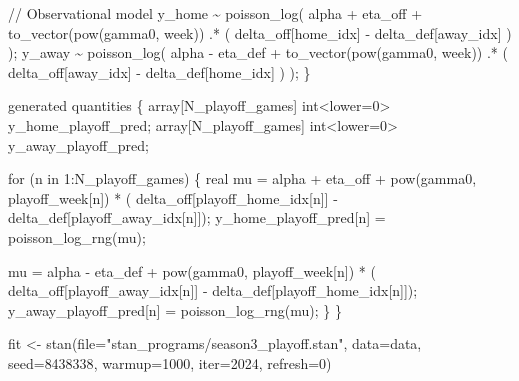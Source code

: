\documentclass[
  letterpaper,
  DIV=11,
  numbers=noendperiod]{scrartcl}
\newenvironment{Shaded}{\begin{snugshade}}{\end{snugshade}}
\newcommand{\AttributeTok}[1]{\textcolor[rgb]{0.40,0.45,0.13}{#1}}
\newcommand{\CommentTok}[1]{\textcolor[rgb]{0.37,0.37,0.37}{#1}}
\newcommand{\ControlFlowTok}[1]{\textcolor[rgb]{0.00,0.23,0.31}{#1}}
\newcommand{\DataTypeTok}[1]{\textcolor[rgb]{0.68,0.00,0.00}{#1}}
\newcommand{\DecValTok}[1]{\textcolor[rgb]{0.68,0.00,0.00}{#1}}
\newcommand{\FunctionTok}[1]{\textcolor[rgb]{0.28,0.35,0.67}{#1}}
\newcommand{\KeywordTok}[1]{\textcolor[rgb]{0.00,0.23,0.31}{#1}}
\newcommand{\NormalTok}[1]{\textcolor[rgb]{0.00,0.23,0.31}{#1}}
\newcommand{\OtherTok}[1]{\textcolor[rgb]{0.00,0.23,0.31}{#1}}
\newcommand{\StringTok}[1]{\textcolor[rgb]{0.13,0.47,0.30}{#1}}
\begin{document}
\begin{codelisting}
\begin{Shaded}
\begin{Highlighting}[]
  \CommentTok{// Observational model}
\NormalTok{  y\_home \textasciitilde{} poisson\_log(  alpha + eta\_off}
\NormalTok{                       + to\_vector(pow(gamma0, week))}
\NormalTok{                         .* (  delta\_off[home\_idx]}
\NormalTok{                             {-} delta\_def[away\_idx] ) );}
\NormalTok{  y\_away \textasciitilde{} poisson\_log(  alpha {-} eta\_def}
\NormalTok{                       + to\_vector(pow(gamma0, week))}
\NormalTok{                         .* (  delta\_off[away\_idx]}
\NormalTok{                             {-} delta\_def[home\_idx] ) );}
\NormalTok{\}}

\KeywordTok{generated quantities}\NormalTok{ \{}
  \DataTypeTok{array}\NormalTok{[N\_playoff\_games] }\DataTypeTok{int}\NormalTok{\textless{}}\KeywordTok{lower}\NormalTok{=}\DecValTok{0}\NormalTok{\textgreater{} y\_home\_playoff\_pred;}
  \DataTypeTok{array}\NormalTok{[N\_playoff\_games] }\DataTypeTok{int}\NormalTok{\textless{}}\KeywordTok{lower}\NormalTok{=}\DecValTok{0}\NormalTok{\textgreater{} y\_away\_playoff\_pred;}

  \ControlFlowTok{for}\NormalTok{ (n }\ControlFlowTok{in} \DecValTok{1}\NormalTok{:N\_playoff\_games) \{}
    \DataTypeTok{real}\NormalTok{ mu =  alpha + eta\_off}
\NormalTok{             + pow(gamma0, playoff\_week[n])}
\NormalTok{               * (  delta\_off[playoff\_home\_idx[n]]}
\NormalTok{                  {-} delta\_def[playoff\_away\_idx[n]]);}
\NormalTok{    y\_home\_playoff\_pred[n] = poisson\_log\_rng(mu);}

\NormalTok{    mu =  alpha {-} eta\_def}
\NormalTok{        + pow(gamma0, playoff\_week[n])}
\NormalTok{          * (  delta\_off[playoff\_away\_idx[n]]}
\NormalTok{             {-} delta\_def[playoff\_home\_idx[n]]);}
\NormalTok{    y\_away\_playoff\_pred[n] = poisson\_log\_rng(mu);}
\NormalTok{  \}}
\NormalTok{\}}
\end{Highlighting}
\end{Shaded}

\end{codelisting}

\begin{Shaded}
\begin{Highlighting}[]
\NormalTok{fit }\OtherTok{\textless{}{-}} \FunctionTok{stan}\NormalTok{(}\AttributeTok{file=}\StringTok{"stan\_programs/season3\_playoff.stan"}\NormalTok{,}
            \AttributeTok{data=}\NormalTok{data, }\AttributeTok{seed=}\DecValTok{8438338}\NormalTok{,}
            \AttributeTok{warmup=}\DecValTok{1000}\NormalTok{, }\AttributeTok{iter=}\DecValTok{2024}\NormalTok{, }\AttributeTok{refresh=}\DecValTok{0}\NormalTok{)}
\end{Highlighting}
\end{Shaded}
\end{document}
